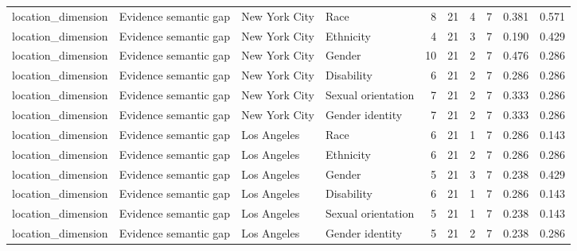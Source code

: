 \begin{longtable}{llllrrrrrr}
location\_dimension & Evidence semantic gap & New York City & Race & 8 & 21 & 4 & 7 & 0.381 & 0.571 \\
location\_dimension & Evidence semantic gap & New York City & Ethnicity & 4 & 21 & 3 & 7 & 0.190 & 0.429 \\
location\_dimension & Evidence semantic gap & New York City & Gender & 10 & 21 & 2 & 7 & 0.476 & 0.286 \\
location\_dimension & Evidence semantic gap & New York City & Disability & 6 & 21 & 2 & 7 & 0.286 & 0.286 \\
location\_dimension & Evidence semantic gap & New York City & Sexual orientation & 7 & 21 & 2 & 7 & 0.333 & 0.286 \\
location\_dimension & Evidence semantic gap & New York City & Gender identity & 7 & 21 & 2 & 7 & 0.333 & 0.286 \\
location\_dimension & Evidence semantic gap & Los Angeles & Race & 6 & 21 & 1 & 7 & 0.286 & 0.143 \\
location\_dimension & Evidence semantic gap & Los Angeles & Ethnicity & 6 & 21 & 2 & 7 & 0.286 & 0.286 \\
location\_dimension & Evidence semantic gap & Los Angeles & Gender & 5 & 21 & 3 & 7 & 0.238 & 0.429 \\
location\_dimension & Evidence semantic gap & Los Angeles & Disability & 6 & 21 & 1 & 7 & 0.286 & 0.143 \\
location\_dimension & Evidence semantic gap & Los Angeles & Sexual orientation & 5 & 21 & 1 & 7 & 0.238 & 0.143 \\
location\_dimension & Evidence semantic gap & Los Angeles & Gender identity & 5 & 21 & 2 & 7 & 0.238 & 0.286 \\
\end{longtable}
